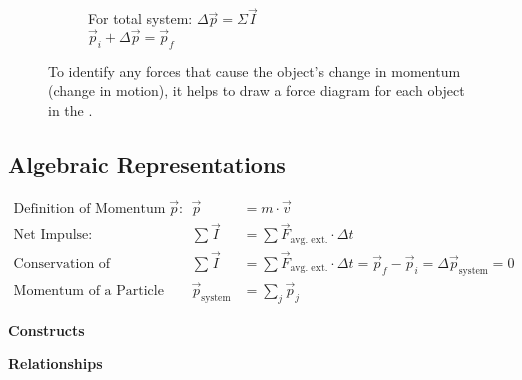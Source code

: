 \begin{figure}[h!]
\begin{subfigure}[b]{0.45\textwidth}
		\caption*{For total system: $\Delta \vec{p} = \Sigma\vec{I}$\\
	\phantom{For total system: } $\vec{p}_i + \Delta\vec{p} = \vec{p}_f$}
	\end{subfigure}
	\caption*{To identify any forces that cause the object's change in momentum (change in motion), it helps to draw a force diagram for each object in the \pchart{}.}
\end{figure}

\subsection*{Algebraic Representations}

\begin{align*}
	\text{Definition of Momentum }\vec{p}\text{:} && \vec{p} &= m \cdot \vec{v}\\[5mm]
	\text{Net Impulse:} && \sum\vec{I} &= \sum\vec{F}_\text{avg. ext.} \cdot \Delta t\\[5mm]
	\text{Conservation of Momentum:} && \sum\vec{I} &= \sum\vec{F}_\text{avg. ext.} \cdot \Delta t = \vec{p}_f - \vec{p}_i = \Delta \vec{p}_\text{system} = 0\\[5mm]
	\text{Momentum of a Particle System:} && \vec{p}_\text{system} &= \sum_j\vec{p}_j
\end{align*}

\pagebreak

\renewcommand{\leftcolumn}{0.375\linewidth}
\renewcommand{\rightcolumn}{0.625\linewidth}

\noindent
\parbox[b]{\leftcolumn}{
	\textbf{Constructs}}
\parbox[b]{\rightcolumn}{
	\textbf{Relationships}}

\vspace*{-\parskip}
\noindent
\hrulefill

